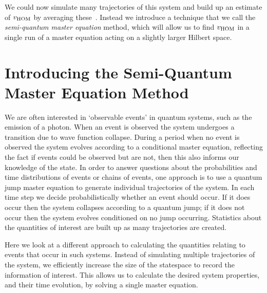 We could now simulate many trajectories of this system and build up an estimate of $v_{\rm HOM}$ by averaging these~\cite{carmichael:92}. Instead we introduce a technique that we call the \textit{semi-quantum master equation} method, which will allow us to find $v_{\rm HOM}$ in a single run of a master equation acting on a slightly larger Hilbert space.

\section{Introducing the Semi-Quantum Master Equation Method}\label{semi_quant_me_section}

We are often interested in `observable events' in quantum systems, such as the emission of a photon. When an event is observed the system undergoes a transition due to wave function collapse. During a period when no event is observed the system evolves according to a conditional master equation, reflecting the fact if events could be observed but are not, then this also informs our knowledge of the state. In order to answer questions about the probabilities and time distributions of events or chains of events, one approach is to use a quantum jump master equation to generate individual trajectories of the system. In each time step we decide probabilistically whether an event should occur. If it does occur then the system collapses according to a quantum jump; if it does not occur then the system evolves conditioned on no jump occurring. Statistics about the quantities of interest are built up as many trajectories are created.

Here we look at a different approach to calculating the quantities relating to events that occur in such systems. Instead of simulating multiple trajectories of the system, we efficiently increase the size of the statespace to record the information of interest. This allows us to calculate the desired system properties, and their time evolution, by solving a single master equation. 

